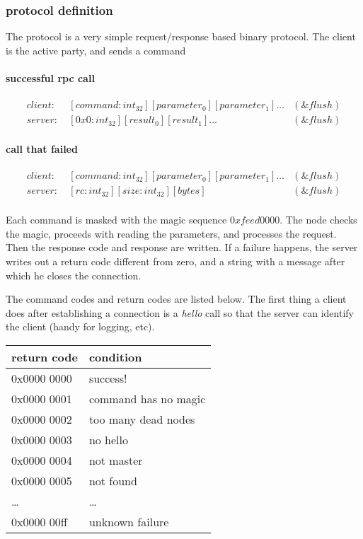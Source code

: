 \subsubsection{protocol definition}
The protocol is a very simple request/response based binary protocol.
The client is the active party, and sends a command
\paragraph{successful rpc call}
\begin{equation*}
\begin{aligned}
client: \ & [command:int_{32}][parameter_0][parameter_1]\ldots & (\&flush) \\
server: \ & [0x0:int_{32}][result_0][result_1]\ldots & (\&flush)
\end{aligned}
\end{equation*}
\paragraph{call that failed}

\begin{equation*}
\begin{aligned}
client: \ & [command : int_{32}][parameter_0][parameter_1]\ldots & (\&flush) \\
server: \ & [rc:int_{32}][size:int_{32}][bytes] & (\&flush) \\
\end{aligned}
\end{equation*}

Each command is masked with the magic sequence $0xfeed0000$.
The node checks the magic, proceeds with reading the parameters, and processes the request.
Then the response code and response are written.
If a failure happens, the server writes out a return code different from zero, and a string with a message after which he closes the connection.

The command codes and return codes are listed below.
The first thing a client does after establishing a connection is a \emph{hello} call so that the server can identify the client (handy for logging, etc).
\begin{table}[ht]
\begin{tabular}{ll}
return code & condition \\
\hline
0x0000 0000  & success!  \\
0x0000 0001  & command has no magic  \\
0x0000 0002  & too many dead nodes \\
0x0000 0003  & no hello        \\
0x0000 0004  & not master      \\
0x0000 0005  & not found       \\
\ldots       & \ldots          \\
0x0000 00ff  & unknown failure \\
\end{tabular}
\end{table}

